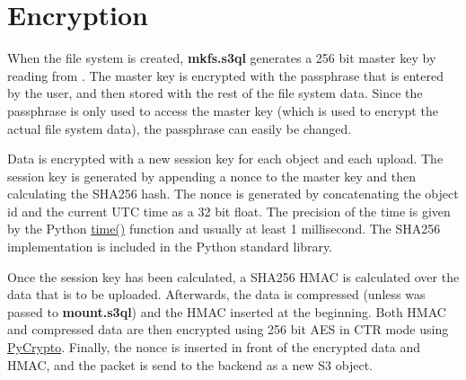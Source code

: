 \documentclass[letterpaper,10pt,english]{sphinxmanual}
\begin{document}
\section{Encryption}
\label{impl_details:encryption}
When the file system is created, \textbf{mkfs.s3ql} generates a 256 bit
master key by reading from . The master key is
encrypted with the passphrase that is entered by the user, and then
stored with the rest of the file system data. Since the passphrase is
only used to access the master key (which is used to encrypt the
actual file system data), the passphrase can easily be changed.

Data is encrypted with a new session key for each object and each
upload. The session key is generated by appending a nonce to the
master key and then calculating the SHA256 hash. The nonce is
generated by concatenating the object id and the current UTC time as a
32 bit float. The precision of the time is given by the Python \href{http://docs.python.org/library/time.html\#time.time}{time()} function and
usually at least 1 millisecond. The SHA256 implementation is included
in the Python standard library.

Once the session key has been calculated, a SHA256 HMAC is calculated
over the data that is to be uploaded. Afterwards, the data is
compressed (unless  was passed to
\textbf{mount.s3ql}) and the HMAC inserted at the beginning. Both HMAC
and compressed data are then encrypted using 256 bit AES in CTR
mode using \href{http://www.pycrypto.org/}{PyCrypto}.  Finally, the nonce is
inserted in front of the encrypted data and HMAC, and the packet is
send to the backend as a new S3 object.



\renewcommand{\indexname}{Index}
\printindex
\end{document}
